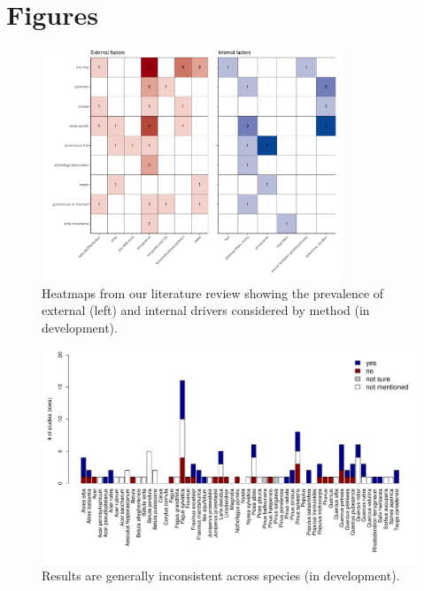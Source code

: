\documentclass[11pt]{article}
\begin{document}
\section*{Figures}

\clearpage
\begin{figure}[h!]
\includegraphics[width=0.8\textwidth]{..//figures/heatmaps/heatmap_combined_endo&exo.pdf}
\caption{Heatmaps from our literature review showing the prevalence of external (left) and internal drivers considered by method (in development).}
\label{fig:heatmapssupp}
\end{figure}



\clearpage
\begin{figure}[h!]
\includegraphics[width=1\textwidth]{..//figures/speciesnums_finds.pdf}
\caption{Results are generally inconsistent across species (in development).}
\label{fig:sppfinds}
\end{figure}
\end{document}
